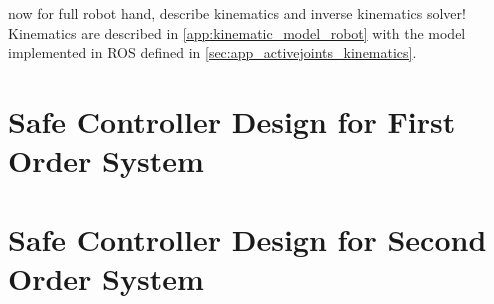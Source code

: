 now for full robot hand, describe kinematics and inverse kinematics solver!
Kinematics are described in \autoref{app:kinematic_model_robot} with the model implemented in ROS defined in \autoref{sec:app_activejoints_kinematics}.

\section{Safe Controller Design for First Order System}

\section{Safe Controller Design for Second Order System}